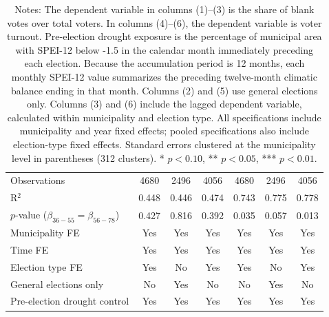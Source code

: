 \begin{table}[!h]
\begin{tabular}[t]{lcccccc}
\addlinespace
Observations & 4680 & 2496 & 4056 & 4680 & 2496 & 4056\\
R$^2$ & 0.448 & 0.446 & 0.474 & 0.743 & 0.775 & 0.778\\
$p$-value ($\beta_{36{-}55} = \beta_{56{-}78}$) & 0.427 & 0.816 & 0.392 & 0.035 & 0.057 & 0.013\\
Municipality FE & Yes & Yes & Yes & Yes & Yes & Yes\\
Time FE & Yes & Yes & Yes & Yes & Yes & Yes\\
Election type FE & Yes & No & Yes & Yes & No & Yes\\
General elections only & No & Yes & No & No & Yes & No\\
Pre-election drought control & Yes & Yes & Yes & Yes & Yes & Yes\\
\hline
\end{tabular}
\vspace{0.3em}
\captionsetup{justification=justified, singlelinecheck=false}
\caption*{\footnotesize Notes: The dependent variable in columns (1)--(3) is the share of blank votes over total voters. In columns (4)--(6), the dependent variable is voter turnout. Pre-election drought exposure is the percentage of municipal area with SPEI-12 below -1.5 in the calendar month immediately preceding each election. Because the accumulation period is 12 months, each monthly SPEI-12 value summarizes the preceding twelve-month climatic balance ending in that month. Columns (2) and (5) use general elections only. Columns (3) and (6) include the lagged dependent variable, calculated within municipality and election type. All specifications include municipality and year fixed effects; pooled specifications also include election-type fixed effects. Standard errors clustered at the municipality level in parentheses (312 clusters). * $p<0.10$, ** $p<0.05$, *** $p<0.01$.}
\end{table}
